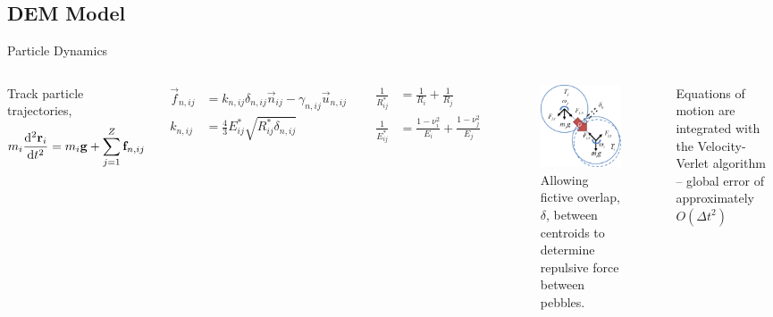 \subsection{DEM Model}
\begin{frame}{Particle Dynamics}
\begin{columns}[t]
	Track particle trajectories,
	\begin{equation}
	\label{eq:newtons-second}
		m_i  \frac{\mathrm{d}^2{\mathbf{r}_i}}{\mathrm{d}t^2}  = m_i\mathbf{g} + \sum_{j=1}^{Z} \mathbf{f}_{n,ij} 
	\end{equation}

	\begin{subequations}
	\begin{align}
		\vec{f}_{n,ij} &= k_{n,ij} \delta_{n,ij}\vec{n}_{ij} - \gamma_{n,ij} \vec{u}_{n,ij} 	\label{eq:normal-force} \\
		k_{n,ij} &= \frac{4}{3}E_{ij}^*\sqrt{R_{ij}^*\delta_{n,ij}}
	\end{align}
	\end{subequations}

	\begin{subequations}
	\begin{align}
		\frac{1}{R_{ij}^*} &= \frac{1}{R_i} + \frac{1}{R_j} \\
		\frac{1}{E_{ij}^*} &= \frac{1-\nu_i^2}{E_i} + \frac{1-\nu_j^2}{E_j}
	\end{align}
	\end{subequations}


	\begin{figure}
		\centering
		\includegraphics[width=0.5\linewidth]{chapters/figures/particle-interaction-drawing} 
		\caption{Allowing fictive overlap, $\delta$, between centroids to determine repulsive force between pebbles.}
		\label{fig:interacting-particles}
	\end{figure}
	 

	Equations of motion are integrated with the Velocity-Verlet algorithm -- global error of approximately $O(\Delta t^2)$

\end{columns}




\end{frame}

